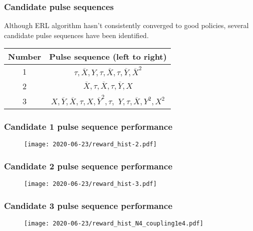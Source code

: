 \documentclass{beamer}
\begin{document}
\begin{frame}
\frametitle{Candidate pulse sequences}

Although ERL algorithm hasn't consistently converged to good policies, several candidate pulse sequences have been identified.

\begin{table}
    \label{tab:candidates}
    \begin{tabular}{c c}
        Number & Pulse sequence (left to right) \\
        \hline
        1 & $\tau, \overline{X}, Y, \tau, \overline{X}, \tau, \overline{Y}, \overline{X}^2$ \\
        2 & $\overline{X}, \tau, \overline{X}, \tau, \overline{Y}, X$ \\
        3 & $X, \overline{Y}, \overline{X}, \tau, X, \overline{Y}^2, \tau, $
            $Y, \tau, \overline{X}, Y^2, X^2$ \\
    \end{tabular}
\end{table}


\end{frame}

\begin{frame}
\frametitle{Candidate 1 pulse sequence performance}

\begin{figure}
    \centering
    \texttt{[image: 2020-06-23/reward\_hist-2.pdf]}
    \label{fig:candidate_1}
\end{figure}

\end{frame}

\begin{frame}
\frametitle{Candidate 2 pulse sequence performance}

\begin{figure}
    \centering
    \texttt{[image: 2020-06-23/reward\_hist-3.pdf]}
    \label{fig:candidate_2}
\end{figure}


\end{frame}

\begin{frame}
\frametitle{Candidate 3 pulse sequence performance}

\begin{figure}
    \centering
    \texttt{[image: 2020-06-23/reward\_hist\_N4\_coupling1e4.pdf]}
    \label{fig:candidate_3}
\end{figure}

\end{frame}
\end{document}

